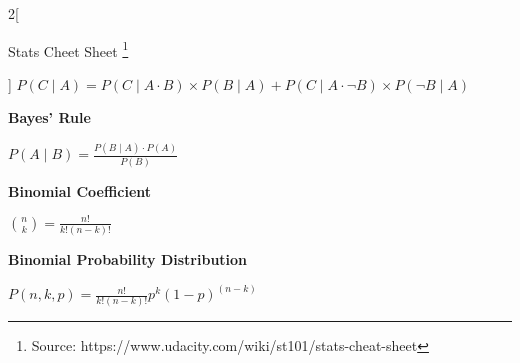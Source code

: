 \documentclass[9pt]{article}
\begin{document}
\begin{multicols}{2}[
	\begin{center}
		Stats Cheet Sheet \footnote{Source: https://www.udacity.com/wiki/st101/stats-cheat-sheet}
	\end{center}]
	$P(C\mid A)=P(C\mid A\cdot B)\times P(B\mid A)+P(C\mid A\cdot\neg B)\times P(\neg B\mid A)$
	
	
	\textbf{Bayes' Rule}
	
	$P(A\mid B)=\frac{P(B\mid A)\cdot P(A)}{P(B)}$
	
	
	\textbf{Binomial Coefficient}
	
	${{n}\choose{k}}=\frac{n!}{k!(n-k)!}$
	
	
	\textbf{Binomial Probability Distribution}
	
	$P(n,k,p)=\frac{n!}{k!(n-k)!}p^k(1-p)^{(n-k)}$
\end{multicols}
\end{document}
